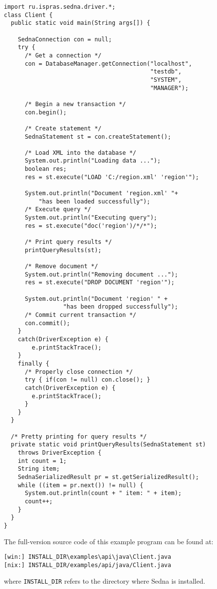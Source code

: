 \documentclass[a4paper,12pt]{article}
\begin{document}
\small{
\begin{verbatim}
import ru.ispras.sedna.driver.*;
class Client {
  public static void main(String args[]) {

    SednaConnection con = null;
    try {
      /* Get a connection */
      con = DatabaseManager.getConnection("localhost",
                                          "testdb",
                                          "SYSTEM",
                                          "MANAGER");

      /* Begin a new transaction */
      con.begin();

      /* Create statement */
      SednaStatement st = con.createStatement();

      /* Load XML into the database */
      System.out.println("Loading data ...");
      boolean res;
      res = st.execute("LOAD 'C:/region.xml' 'region'");

      System.out.println("Document 'region.xml' "+
          "has been loaded successfully");
      /* Execute query */
      System.out.println("Executing query");
      res = st.execute("doc('region')/*/*");

      /* Print query results */
      printQueryResults(st);

      /* Remove document */
      System.out.println("Removing document ...");
      res = st.execute("DROP DOCUMENT 'region'");

      System.out.println("Document 'region' " +
                 "has been dropped successfully");
      /* Commit current transaction */
      con.commit();
    }
    catch(DriverException e) {
        e.printStackTrace();
    }
    finally {
      /* Properly close connection */
      try { if(con != null) con.close(); }
      catch(DriverException e) {
        e.printStackTrace();
      }
    }
  }

  /* Pretty printing for query results */
  private static void printQueryResults(SednaStatement st)
    throws DriverException {
    int count = 1;
    String item;
    SednaSerializedResult pr = st.getSerializedResult();
    while ((item = pr.next()) != null) {
      System.out.println(count + " item: " + item);
      count++;
    }
  }
}
\end{verbatim}}

The full-version source code of this example program can be found at:
\begin{verbatim}
[win:] INSTALL_DIR\examples\api\java\Client.java
[nix:] INSTALL_DIR/examples/api/java/Client.java
\end{verbatim}
where \verb!INSTALL_DIR! refers to the directory where Sedna is installed.
\end{document}
